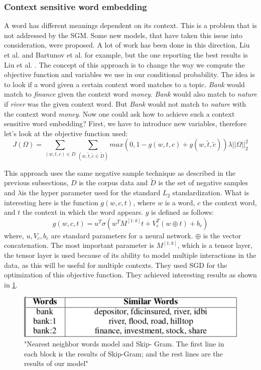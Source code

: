 \documentclass[conference]{IEEEtran}
\begin{document}
\subsubsection{Context sensitive word embedding}
A word has different meanings dependent on its context. This is a problem that is not addressed by the SGM. Some new models, that have taken this issue into consideration, were proposed. A lot of work has been done in this direction, Liu et al.\cite{topicalWE} and Bartunov et al.\cite{breaking} for example, but the one reporting the best results is Liu et al. \cite{contextWithTensor}. The concept of this approach is to change the way we compute the objective function and variables we use in our conditional probability. The idea is to look if a word given a certain context word matches to a topic. \textit{Bank} would match to \textit{finance} given the context word \textit{money}. \textit{Bank} would also match to \textit{nature} if \textit{river} was the given context word. But \textit{Bank} would not match to \textit{nature} with the context word \textit{money}. Now one could ask how to achieve such a context sensitive word embedding? First, we have to introduce new variables, therefore let's look at the objective function used:
\begin{equation}
J(\Omega) = \sum_{(w,t,c)\in D} \sum_{(w,\tilde{t},\tilde{c} \in{\tilde{D}})} max(0,1- g(w,t,c) + g(w,\tilde{t},\tilde{c})) \lambda||\Omega||_{2}^2
\end{equation}

This approach uses the same negative sample technique as described in the previous subsections, $D$ is the corpus data and $\tilde{D}$ is the set of negative samples and $\lambda$is the hyper parameter used for the standard $L_2$ standardization. What is interesting here is the function $g(w,c,t)$, where $w$ is a word, $c$ the context word, and $t$ the context in which the word appears. $g$ is defined as follows:
\begin{equation}
g(w,c,t) = u^T \sigma(w^TM^{[1:k]}t+V_c^T(w \oplus t) + b_c)
\end{equation}
where, $u, V_c, b_c$ are standard parameters for a neural network. $\oplus$ is the vector concatenation. The most important parameter is $M^{[1:k]}$, which is a tensor layer, the tensor layer is used because of its ability to model multiple interactions in the data, as this will be useful for multiple contexts. They used SGD for the optimization of this objective function. They achieved interesting results as shown in \ref{fig:multipleContext}.\\
\begin{figure}[ht]
\centering
\includegraphics[scale=0.7]{images/multipleContext.png}
\caption{"Nearest neighbor words model and Skip-
Gram. The first line in each block is the results of Skip-Gram;
and the rest lines are the results of our model" \cite{contextWithTensor}}
\label{fig:multipleContext}
\end{figure}
\end{document}
